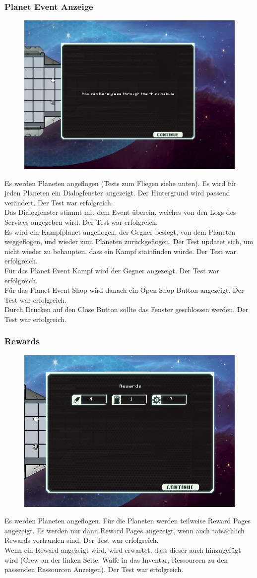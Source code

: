 \documentclass[fontsize=12pt,paper=a4,twoside]{scrartcl}
\begin{document}
\subsubsection{Planet Event Anzeige}
\begin{figure}[h!]
\centering
\includegraphics[width=0.5\linewidth]{images/event.png}
\end{figure}
Es werden Planeten angeflogen (Tests zum Fliegen siehe unten). Es wird für jeden Planeten ein Dialogfenster angezeigt. Der Hintergrund wird passend verändert. Der Test war erfolgreich. \\
Das Dialogfenster stimmt mit dem Event überein, welches von den Logs des Services angegeben wird. Der Test war erfolgreich. \\
Es wird ein Kampfplanet angeflogen, der Gegner besiegt, von dem Planeten weggeflogen, und wieder zum Planeten zurückgeflogen. Der Test updatet sich, um nicht wieder zu behaupten, dass ein Kampf stattfinden würde. Der Test war erfolgreich. \\
Für das Planet Event Kampf wird der Gegner angezeigt. Der Test war erfolgreich. \\
Für das Planet Event Shop wird danach ein Open Shop Button angezeigt. Der Test war erfolgreich. \\
Durch Drücken auf den Close Button sollte das Fenster geschlossen werden.  Der Test war erfolgreich. \\
\subsubsection{Rewards}
\begin{figure}[h!]
\centering
\includegraphics[width=0.5\linewidth]{images/rewards.png}
\end{figure}
Es werden Planeten angeflogen. Für die Planeten werden teilweise Reward Pages angezeigt. Es werden nur dann Reward Pages angezeigt, wenn auch tatsächlich Rewards vorhanden sind. Der Test war erfolgreich. \\
Wenn ein Reward angezeigt wird, wird erwartet, dass dieser auch hinzugefügt wird (Crew an der linken Seite, Waffe in das Inventar, Ressourcen zu den passenden Ressourcen Anzeigen). Der Test war erfolgreich. \\
\end{document}
